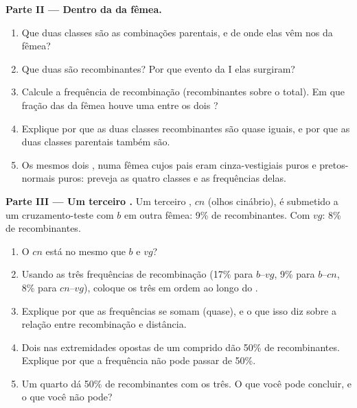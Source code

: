 \begin{problem}
\medskip
\noindent\textbf{Parte II --- Dentro da  da fêmea.}
\begin{enumerate}[resume]
  \item Que duas classes são as combinações parentais, e de onde elas
        vêm nos  da fêmea?
  \item Que duas são recombinantes? Por que evento da  I elas
        surgiram?
  \item Calcule a frequência de recombinação (recombinantes sobre o
        total). Em que fração das  da fêmea houve uma 
        entre os dois ?
  \item Explique por que as duas classes recombinantes são quase
        iguais, e por que as duas classes parentais também são.
  \item Os mesmos dois , numa fêmea cujos pais eram
        cinza-vestigiais puros e pretos-normais puros: preveja as
        quatro classes e as frequências delas.
\end{enumerate}

\medskip
\noindent\textbf{Parte III --- Um terceiro .}
Um terceiro , $cn$ (olhos cinábrio), é submetido a um
cruzamento-teste com $b$ em outra fêmea: 9\% de recombinantes. Com
$vg$: 8\% de recombinantes.
\begin{enumerate}[resume]
  \item O $cn$ está no mesmo  que $b$ e $vg$?
  \item Usando as três frequências de recombinação (17\% para
        $b$--$vg$, 9\% para $b$--$cn$, 8\% para $cn$--$vg$), coloque os
        três  em ordem ao longo do .
  \item Explique por que as frequências se somam (quase), e o que isso
        diz sobre a relação entre recombinação e distância.
  \item Dois  nas extremidades opostas de um  comprido
        dão 50\% de recombinantes. Explique por que a frequência não
        pode passar de 50\%.
  \item Um quarto  dá 50\% de recombinantes com os três. O que você
        pode concluir, e o que você não pode?
\end{enumerate}


\end{problem}
